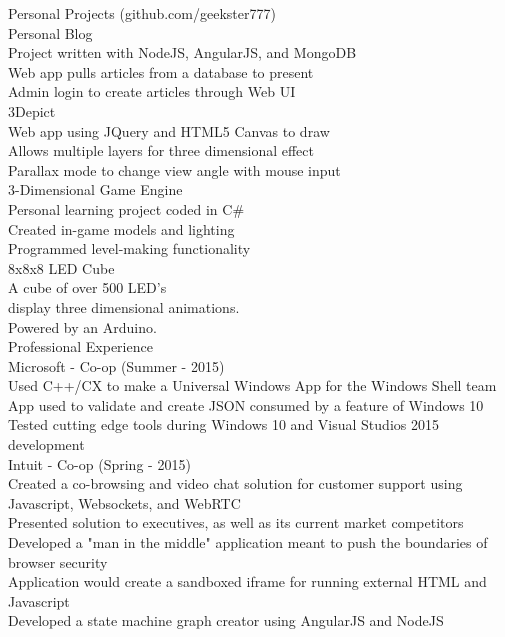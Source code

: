 \documentclass{article}
\begin{document}
{\Large Personal Projects (github.com/geekster777) } \\ 
{\large Personal Blog } \\
Project written with NodeJS, AngularJS, and MongoDB \\
Web app pulls articles from a database to present \\
Admin login to create articles through Web UI \\
{\large 3Depict } \\
Web app using JQuery and HTML5 Canvas to draw \\
Allows multiple layers for three dimensional effect \\
Parallax mode to change view angle with mouse input \\
{\large 3-Dimensional Game Engine } \\
Personal learning project coded in C\# \\
Created in-game models and lighting  \\
Programmed level-making functionality \\
{\large 8x8x8 LED Cube } \\
A cube of over 500 LED's \\
display three dimensional animations. \\
Powered by an Arduino. \\
{\Large Professional Experience } \\
{\large Microsoft - Co-op (Summer - 2015) } \\
Used C++/CX to make a Universal Windows App for the Windows Shell team \\
App used to validate and create JSON consumed by a feature of Windows 10 \\
Tested cutting edge tools during Windows 10 and Visual Studios 2015 development \\
{\large Intuit - Co-op (Spring - 2015) } \\
Created a co-browsing and video chat solution for customer support using Javascript, Websockets, and WebRTC \\
Presented solution to executives, as well as its current market competitors \\
Developed a "man in the middle" application meant to push the boundaries of browser security \\
Application would create a sandboxed iframe for running external HTML and Javascript \\
Developed a state machine graph creator using AngularJS and NodeJS \\
\end{document}
